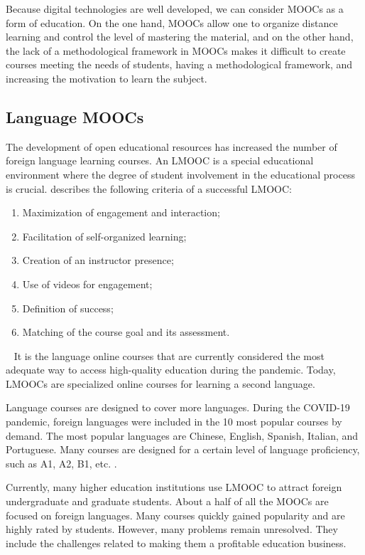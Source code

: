 \documentclass[english]{textolivre}
\begin{document}
Because digital technologies are well developed, we can consider MOOCs as a form of education. On the one hand, MOOCs allow one to organize distance learning and control the level of mastering the material, and on the other hand, the lack of a methodological framework in MOOCs makes it difficult to create courses meeting the needs of students, having a methodological framework, and increasing the motivation to learn the subject.

\subsection{Language MOOCs}\label{sec-conduta}
The development of open educational resources has increased the number of foreign language learning courses. An LMOOC is a special educational environment where the degree of student involvement in the educational process is crucial.
\textcite[p. 27–28]{sokolik_2_2014} describes the following criteria of a successful LMOOC:

\begin{enumerate}
    \item Maximization of engagement and interaction;
    \item Facilitation of self-organized learning;
    \item Creation of an instructor presence;
    \item Use of videos for engagement;
    \item Definition of success;
    \item Matching of the course goal and its assessment.
\end{enumerate}
 
It is the language online courses that are currently considered the most adequate way to access high-quality education during the pandemic. Today, LMOOCs are specialized online courses for learning a second language.

Language courses are designed to cover more languages. During the COVID-19 pandemic, foreign languages were included in the 10 most popular courses by demand. The most popular languages are Chinese, English, Spanish, Italian, and Portuguese. Many courses are designed for a certain level of language proficiency, such as A1, A2, B1, etc. \cite{shah_second_2020}.

Currently, many higher education institutions use LMOOC to attract foreign undergraduate and graduate students. About a half of all the MOOCs are focused on foreign languages. Many courses quickly gained popularity and are highly rated by students. However, many problems remain unresolved. They include the challenges related to making them a profitable education business.
\end{document}
